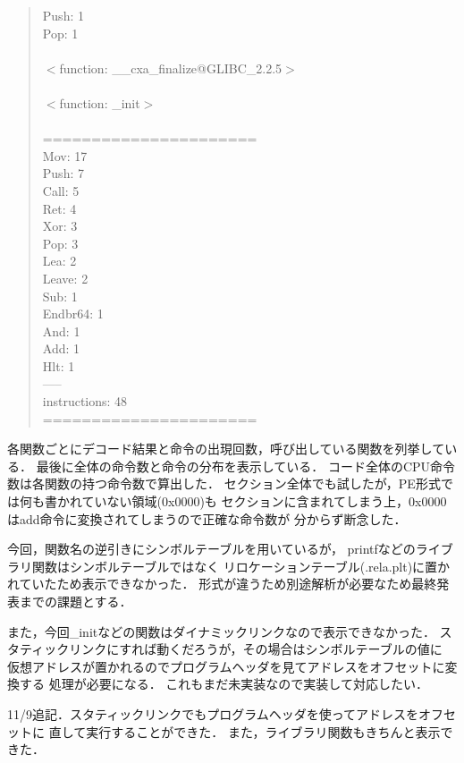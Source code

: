 \documentclass[12pt,a4paper,dvipdfmx]{jsarticle}
\begin{document}
\begin{quote}
Push: 1 \\
Pop: 1 \\
 \\
$<$function: \_\_cxa\_finalize@GLIBC\_2.2.5$>$ \\
 \\
$<$function: \_init$>$ \\
 \\
====================== \\
Mov: 17 \\
Push: 7 \\
Call: 5 \\
Ret: 4 \\
Xor: 3 \\
Pop: 3 \\
Lea: 2 \\
Leave: 2 \\
Sub: 1 \\
Endbr64: 1 \\
And: 1 \\
Add: 1 \\
Hlt: 1 \\
----- \\
instructions: 48 \\
======================
\end{quote}

各関数ごとにデコード結果と命令の出現回数，呼び出している関数を列挙している．
最後に全体の命令数と命令の分布を表示している．
コード全体のCPU命令数は各関数の持つ命令数で算出した．
セクション全体でも試したが，PE形式では何も書かれていない領域(0x0000)も
セクションに含まれてしまう上，0x0000はadd命令に変換されてしまうので正確な命令数が
分からず断念した．

今回，関数名の逆引きにシンボルテーブルを用いているが，
printfなどのライブラリ関数はシンボルテーブルではなく
リロケーションテーブル(.rela.plt)に置かれていたため表示できなかった．
形式が違うため別途解析が必要なため最終発表までの課題とする．

また，今回\_initなどの関数はダイナミックリンクなので表示できなかった．
スタティックリンクにすれば動くだろうが，その場合はシンボルテーブルの値に
仮想アドレスが置かれるのでプログラムヘッダを見てアドレスをオフセットに変換する
処理が必要になる．
これもまだ未実装なので実装して対応したい．

11/9追記．スタティックリンクでもプログラムヘッダを使ってアドレスをオフセットに
直して実行することができた．
また，ライブラリ関数もきちんと表示できた．
\end{document}
